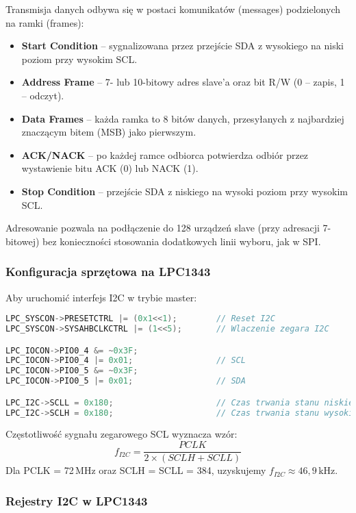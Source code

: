 \documentclass[a4paper,12pt]{report}
\begin{document}
Transmisja danych odbywa się w postaci komunikatów (messages) podzielonych na ramki (frames):
\begin{itemize}
    \item \textbf{Start Condition} – sygnalizowana przez przejście SDA z wysokiego na niski poziom przy wysokim SCL.
    \item \textbf{Address Frame} – 7- lub 10-bitowy adres slave’a oraz bit R/W (0 – zapis, 1 – odczyt).
    \item \textbf{Data Frames} – każda ramka to 8 bitów danych, przesyłanych z najbardziej znaczącym bitem (MSB) jako pierwszym.
    \item \textbf{ACK/NACK} – po każdej ramce odbiorca potwierdza odbiór przez wystawienie bitu ACK (0) lub NACK (1).
    \item \textbf{Stop Condition} – przejście SDA z niskiego na wysoki poziom przy wysokim SCL.
\end{itemize}

Adresowanie pozwala na podłączenie do 128 urządzeń slave (przy adresacji 7-bitowej) bez konieczności stosowania dodatkowych linii wyboru, jak w SPI.

\subsubsection*{Konfiguracja sprzętowa na LPC1343}

Aby uruchomić interfejs I2C w trybie master:
\begin{lstlisting}[language=C]
LPC_SYSCON->PRESETCTRL |= (0x1<<1);        // Reset I2C
LPC_SYSCON->SYSAHBCLKCTRL |= (1<<5);       // Wlaczenie zegara I2C

LPC_IOCON->PIO0_4 &= ~0x3F;
LPC_IOCON->PIO0_4 |= 0x01;                 // SCL
LPC_IOCON->PIO0_5 &= ~0x3F;
LPC_IOCON->PIO0_5 |= 0x01;                 // SDA

LPC_I2C->SCLL = 0x180;                     // Czas trwania stanu niskiego SCL
LPC_I2C->SCLH = 0x180;                     // Czas trwania stanu wysokiego SCL
\end{lstlisting}

Częstotliwość sygnału zegarowego SCL wyznacza wzór:
\[
f_{I2C} = \frac{PCLK}{2 \times (SCLH + SCLL)}
\]
Dla PCLK = 72\,MHz oraz SCLH = SCLL = 384, uzyskujemy \(f_{I2C} \approx 46,9\,\mathrm{kHz}\).

\subsubsection*{Rejestry I2C w LPC1343}
\end{document}

